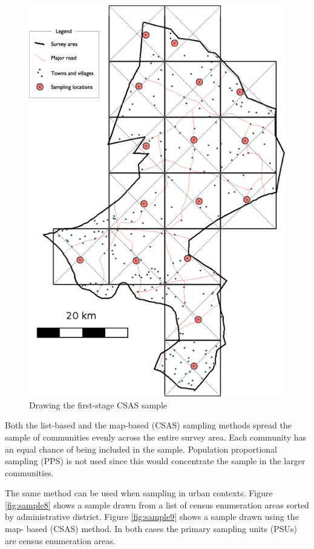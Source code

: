 \documentclass[12pt,a4paper]{book}
\theoremstyle{definition}
\theoremstyle{definition}
\theoremstyle{definition}
\theoremstyle{remark}
\begin{document}
\begin{figure}[H]

{\centering \includegraphics{figures/mapSample3} 

}

\caption{Drawing the first-stage CSAS sample}\label{fig:sample7}
\end{figure}

Both the list-based and the map-based (CSAS) sampling methods spread the
sample of communities evenly across the entire survey area. Each
community has an equal chance of being included in the sample.
Population proportional sampling (PPS) is not used since this would
concentrate the sample in the larger communities.

The same method can be used when sampling in urban contexts. Figure
\ref{fig:sample8} shows a sample drawn from a list of census enumeration
areas sorted by administrative district. Figure \ref{fig:sample9} shows
a sample drawn using the map- based (CSAS) method. In both cases the
primary sampling units (PSUs) are census enumeration areas.
\end{document}
